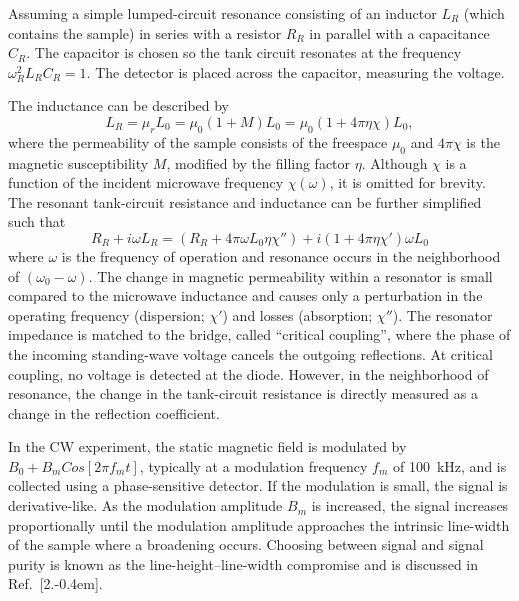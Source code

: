 Assuming a simple lumped-circuit resonance consisting of an inductor $L_R$ (which contains the sample) in series with a resistor $R_R$ in parallel with a capacitance $C_R$. The capacitor is chosen so the tank circuit resonates at the frequency $\omega_R^2 L_R C_R = 1$. The detector is placed across the capacitor, measuring the voltage. 

The inductance can be described by
\begin{equation}
    L_R = \mu_r L_0 = \mu_0 (1 + M)L_0 = \mu_0 (1 + 4 \pi \eta \chi)L_0,
\end{equation}
where the permeability of the sample consists of the freespace $\mu_0$ and $4\pi\chi$ is the magnetic susceptibility $M$, modified by the filling factor $\eta$. \cite{ramo1984fields} Although $\chi$ is a function of the incident microwave frequency $\chi(\omega)$, it is omitted for brevity. The resonant tank-circuit resistance and inductance can be further simplified such that
\begin{equation}
    R_R + i \omega L_R = (R_R + 4\pi \omega L_0 \eta \chi'') + i (1+4\pi\eta\chi')\omega L_0
\end{equation}
where $\omega$ is the frequency of operation and resonance occurs in the neighborhood of $(\omega_0-\omega)$. \cite{schumacher1970introduction} The change in magnetic permeability within a resonator is small compared to the microwave inductance and causes only a perturbation in the operating frequency (dispersion; $\chi'$) and losses (absorption; $\chi''$). The resonator impedance is matched to the bridge, called ``critical coupling'', where the phase of the incoming standing-wave voltage cancels the outgoing reflections. At critical coupling, no voltage is detected at the diode. However, in the neighborhood of resonance, the change in the tank-circuit resistance is directly measured as a change in the reflection coefficient. 

In the CW experiment, the static magnetic field is modulated by $B_0 + B_m Cos[2\pi f_m t]$, typically at a modulation frequency $f_m$ of 100~kHz, and is collected using a phase-sensitive detector. \cite{weil2007electron} If the modulation is small, the signal is derivative-like. \cite{Hyde1990pseudo} As the modulation amplitude $B_m$ is increased, the signal increases proportionally until the modulation amplitude approaches the intrinsic line-width of the sample where a broadening occurs. Choosing between signal and signal purity is known as the line-height--line-width compromise and is discussed in Ref.~[2.\kern-0.4em]. 

